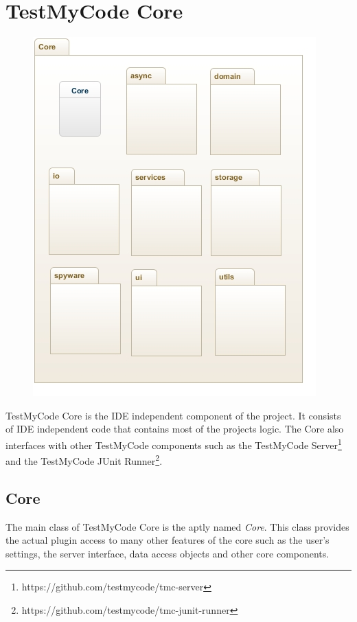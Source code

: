 \documentclass[12pt,a4paper,english,leqno]{article}
\begin{document}
\section{TestMyCode Core}

\begin{figure}[H]
\centering
\includegraphics[scale=1]{img/core.jpg}
\end{figure}

TestMyCode Core is the IDE independent component of the project.
It consists of IDE independent code that contains most of the projects logic.
The Core also interfaces with other TestMyCode components such as the TestMyCode Server\footnote{https://github.com/testmycode/tmc-server} and the TestMyCode JUnit Runner\footnote{https://github.com/testmycode/tmc-junit-runner}.

\subsection{Core}

The main class of TestMyCode Core is the aptly named \textit{Core}.
This class provides the actual plugin access to many other features of the core such as the user's settings, the server interface, data access objects and other core components.
\end{document}
